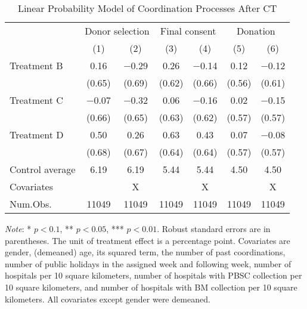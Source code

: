 \documentclass[12pt, a4paper]{article}
\begin{document}
\begin{table}

\caption{\label{tab:lm-coordinate}Linear Probability Model of Coordination Processes After CT}
\centering
\fontsize{8}{10}\selectfont
\begin{threeparttable}
\begin{tabular}[t]{lcccccc}
\toprule
\multicolumn{1}{c}{ } & \multicolumn{2}{c}{Donor selection} & \multicolumn{2}{c}{Final consent} & \multicolumn{2}{c}{Donation} \\
\cmidrule(l{3pt}r{3pt}){2-3} \cmidrule(l{3pt}r{3pt}){4-5} \cmidrule(l{3pt}r{3pt}){6-7}
  & (1) & (2) & (3) & (4) & (5) & (6)\\
\midrule
Treatment B & \num{0.16} & \num{-0.29} & \num{0.26} & \num{-0.14} & \num{0.12} & \num{-0.12}\\
 & (\num{0.65}) & (\num{0.69}) & (\num{0.62}) & (\num{0.66}) & (\num{0.56}) & (\num{0.61})\\
Treatment C & \num{-0.07} & \num{-0.32} & \num{0.06} & \num{-0.16} & \num{0.02} & \num{-0.15}\\
 & (\num{0.66}) & (\num{0.65}) & (\num{0.63}) & (\num{0.62}) & (\num{0.57}) & (\num{0.57})\\
Treatment D & \num{0.50} & \num{0.26} & \num{0.63} & \num{0.43} & \num{0.07} & \num{-0.08}\\
 & (\num{0.68}) & (\num{0.67}) & (\num{0.64}) & (\num{0.64}) & (\num{0.57}) & (\num{0.57})\\
\midrule
Control average & 6.19 & 6.19 & 5.44 & 5.44 & 4.50 & 4.50\\
Covariates &  & X &  & X &  & X\\
Num.Obs. & \num{11049} & \num{11049} & \num{11049} & \num{11049} & \num{11049} & \num{11049}\\
\bottomrule
\end{tabular}
\begin{tablenotes}
\item \emph{Note}: * $p < 0.1$, ** $p < 0.05$, *** $p < 0.01$. Robust standard errors are in parentheses. The unit of treatment effect is a percentage point. Covariates are gender, (demeaned) age, its squared term, the number of past coordinations, number of public holidays in the assigned week and following week, number of hospitals per 10 square kilometers, number of hospitals with PBSC collection per 10 square kilometers, and number of hospitals with BM collection per 10 square kilometers. All covariates except gender were demeaned.
\end{tablenotes}
\end{threeparttable}
\end{table}
\end{document}
